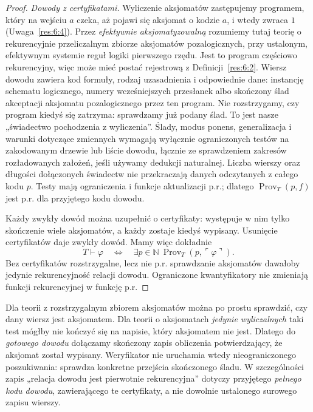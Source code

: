 \begin{proof}
\emph{Dowody z certyfikatami.} Wyliczenie aksjomatów zastępujemy programem, który na wejściu $a$ czeka, aż pojawi się aksjomat o kodzie $a$, i wtedy zwraca $1$ (Uwaga~\ref{res:6:4}). Przez \emph{efektywnie aksjomatyzowalną} rozumiemy tutaj teorię o rekurencyjnie przeliczalnym zbiorze aksjomatów pozalogicznych, przy ustalonym, efektywnym systemie reguł logiki pierwszego rzędu. Jest to program częściowo rekurencyjny, więc może mieć postać rejestrową z Definicji~\ref{res:6:2}. Wiersz dowodu zawiera kod formuły, rodzaj uzasadnienia i odpowiednie dane: instancję schematu logicznego, numery wcześniejszych przesłanek albo skończony ślad akceptacji aksjomatu pozalogicznego przez ten program. Nie rozstrzygamy, czy program kiedyś się zatrzyma: sprawdzamy już podany ślad. To jest nasze „świadectwo pochodzenia z wyliczenia”. Ślady, modus ponens, generalizacja i warunki dotyczące zmiennych wymagają wyłącznie ograniczonych testów na zakodowanym drzewie lub liście dowodu, łącznie ze sprawdzeniem zakresów rozładowanych założeń, jeśli używamy dedukcji naturalnej. Liczba wierszy oraz długości dołączonych świadectw nie przekraczają danych odczytanych z całego kodu $p$. Testy mają ograniczenia i funkcje aktualizacji p.r.; dlatego $\operatorname{Prov}_T(p,f)$ jest p.r. dla przyjętego kodu dowodu.

Każdy zwykły dowód można uzupełnić o certyfikaty: występuje w nim tylko skończenie wiele aksjomatów, a każdy zostaje kiedyś wypisany. Usunięcie certyfikatów daje zwykły dowód. Mamy więc dokładnie
\[
T\vdash\varphi\quad\Longleftrightarrow\quad\exists p\in\mathbb N\ \operatorname{Prov}_T(p,\ulcorner\varphi\urcorner).
\]
Bez certyfikatów rozstrzygalne, lecz nie p.r. sprawdzanie aksjomatów dawałoby jedynie rekurencyjność relacji dowodu. Ograniczone kwantyfikatory nie zmieniają funkcji rekurencyjnej w funkcję p.r.
\end{proof}

\begin{uwaga}
Dla teorii z rozstrzygalnym zbiorem aksjomatów można po prostu
sprawdzić, czy dany wiersz jest aksjomatem. Dla teorii o aksjomatach
\emph{jedynie wyliczalnych} taki test mógłby nie kończyć się na
napisie, który aksjomatem nie jest. Dlatego do \emph{gotowego dowodu}
dołączamy skończony zapis obliczenia potwierdzający, że aksjomat
został wypisany. Weryfikator nie uruchamia wtedy nieograniczonego
poszukiwania: sprawdza konkretne przejścia skończonego śladu.
W szczególności zapis „relacja dowodu jest pierwotnie rekurencyjna”
dotyczy przyjętego \emph{pełnego kodu dowodu}, zawierającego te
certyfikaty, a nie dowolnie ustalonego surowego zapisu wierszy.
\end{uwaga}

